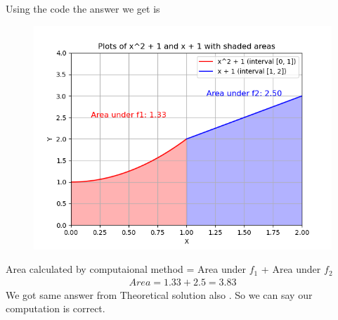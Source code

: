 \documentclass[journal]{IEEEtran}
\begin{document}
Using the code the answer we get is
\begin{figure}[H]
	\centering
	\includegraphics[width = \columnwidth]{figs/Figure_1.png}
	\label{fig}
\end{figure}
Area calculated by computaional method = Area under $f_1$ + Area under $f_2$ \\
\begin{align}
Area = 1.33 + 2.5 = 3.83
\end{align}
We got same answer from Theoretical solution also . So we can say our computation is correct.
\end{document}
